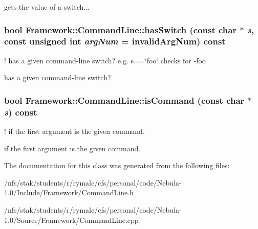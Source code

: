 gets the value of a switch... \hypertarget{classFramework_1_1CommandLine_af4c67cb238a4604c45ad8871269b8489}{
\subsubsection[{hasSwitch}]{\setlength{\rightskip}{0pt plus 5cm}bool Framework::CommandLine::hasSwitch (const char $\ast$ {\em s}, \/  const unsigned int {\em argNum} = {\ttfamily invalidArgNum}) const}}
\label{classFramework_1_1CommandLine_af4c67cb238a4604c45ad8871269b8489}
! has a given command-\/line switch? e.g. s==\char`\"{}foo\char`\"{} checks for -\/foo 

has a given command-\/line switch? \hypertarget{classFramework_1_1CommandLine_a75af5f62d04b30d2c7fbae3af303b5cc}{
\subsubsection[{isCommand}]{\setlength{\rightskip}{0pt plus 5cm}bool Framework::CommandLine::isCommand (const char $\ast$ {\em s}) const}}
\label{classFramework_1_1CommandLine_a75af5f62d04b30d2c7fbae3af303b5cc}


! if the first argument is the given command. 

if the first argument is the given command. 

The documentation for this class was generated from the following files:\begin{DoxyCompactItemize}
\item 
/nfs/stak/students/r/rymalc/cfs/personal/code/Nebula-\/1.0/Include/Framework/CommandLine.h\item 
/nfs/stak/students/r/rymalc/cfs/personal/code/Nebula-\/1.0/Source/Framework/CommandLine.cpp\end{DoxyCompactItemize}
